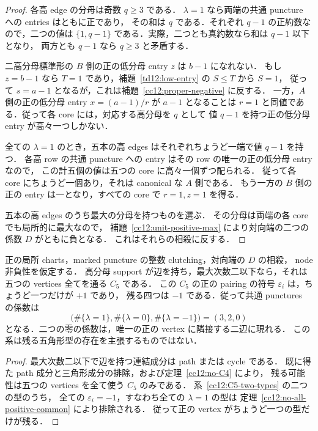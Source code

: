 \begin{proof}
各高 edge の分母は奇数 $q\geq3$ である．
$\lambda=1$ なら両端の共通 puncture への entries はともに正であり，
その和は $q$ である．それぞれ $q-1$ の正約数なので，二つの値は
$\{1,q-1\}$ である．実際，二つとも真約数なら和は $q-1$ 以下となり，
両方とも $q-1$ なら $q\geq3$ と矛盾する．

二高分母標準形の $B$ 側の正の低分母 entry $z$ は $b-1$ になれない．
もし $z=b-1$ なら $T=1$ であり，補題~\ref{td12:low-entry} の $S\leq T$ から $S=1$，
従って $s=a-1$ となるが，これは補題~\ref{cc12:proper-negative} に反する．
一方，$A$ 側の正の低分母 entry $x=(a-1)/r$ が $a-1$ となることは
$r=1$ と同値である．従って各 core には，対応する高分母を $q$ として
値 $q-1$ を持つ正の低分母 entry が高々一つしかない．

全ての $\lambda=1$ のとき，五本の高 edges はそれぞれちょうど一端で値 $q-1$ を持つ．
各高 row の共通 puncture への entry はその row の唯一の正の低分母 entry なので，
この計五個の値は五つの core に高々一個ずつ配られる．
従って各 core にちょうど一個あり，それは canonical な $A$ 側である．
もう一方の $B$ 側の正の entry は一となり，すべての core で $r=1,z=1$ を得る．

五本の高 edges のうち最大の分母を持つものを選ぶ．
その分母は両端の各 core でも局所的に最大なので，
補題~\ref{cc12:unit-positive-max} により対向端の二つの係数 $D$ がともに負となる．
これはそれらの相殺に反する．
\end{proof}

\begin{corollary}[最大次数二の場合に残る唯一の五角形型]
\label{cc12:C5-one-type}
正の局所 charts，marked puncture の整数 clutching，対向端の $D$ の相殺，
node 非負性を仮定する．
高分母 support が辺を持ち，最大次数二以下なら，それは五つの vertices 全てを通る $C_5$ である．
この $C_5$ の正の pairing の符号 $\varepsilon_i$ は，ちょうど一つだけが $+1$ であり，
残る四つは $-1$ である．従って共通 punctures の係数は
\[
 \bigl(\#\{\lambda=1\},\#\{\lambda=0\},\#\{\lambda=-1\}\bigr)
 =(3,2,0)
\]
となる．二つの零の係数は，唯一の正の vertex に隣接する二辺に現れる．
この系は残る五角形型の存在を主張するものではない．
\end{corollary}

\begin{proof}
最大次数二以下で辺を持つ連結成分は path または cycle である．
既に得た path 成分と三角形成分の排除，および定理~\ref{cc12:no-C4} により，
残る可能性は五つの vertices を全て使う $C_5$ のみである．
系~\ref{cc12:C5-two-types} の二つの型のうち，
全ての $\varepsilon_i=-1$，すなわち全ての $\lambda=1$ の型は
定理~\ref{cc12:no-all-positive-common} により排除される．
従って正の vertex がちょうど一つの型だけが残る．
\end{proof}
